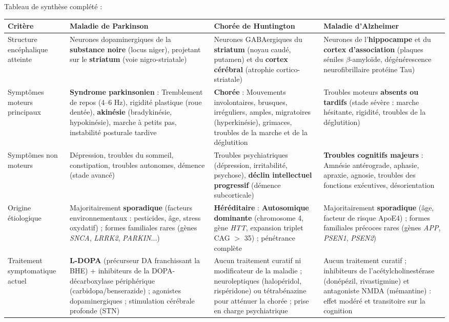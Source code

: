 \documentclass[11pt]{article}
\begin{document}
\begin{corrige}
Tableau de synthèse complété :
\begin{center}
\begin{tabularx}{\linewidth}{|l|X|X|X|}
\hline
\rowcolor{popblueL} Critère & \textbf{Maladie de Parkinson} & \textbf{Chorée de Huntington} & \textbf{Maladie d'Alzheimer} \\
\hline
Structure encéphalique atteinte & Neurones dopaminergiques de la \textbf{substance noire} (locus niger), projetant sur le \textbf{striatum} (voie nigro-striatale) & Neurones GABAergiques du \textbf{striatum} (noyau caudé, putamen) et du \textbf{cortex cérébral} (atrophie cortico-striatale) & Neurones de l'\textbf{hippocampe} et du \textbf{cortex d'association} (plaques séniles $\beta$-amyloïde, dégénérescence neurofibrillaire protéine Tau) \\
\hline
Symptômes moteurs principaux & \textbf{Syndrome parkinsonien} : Tremblement de repos (4--6 Hz), rigidité plastique (roue dentée), \textbf{akinésie} (bradykinésie, hypokinésie), marche à petits pas, instabilité posturale tardive & \textbf{Chorée} : Mouvements involontaires, brusques, irréguliers, amples, migratoires (hyperkinésie), grimaces, troubles de la marche et de la déglutition & Troubles moteurs \textbf{absents ou tardifs} (stade sévère : marche hésitante, rigidité, troubles de la déglutition) \\
\hline
Symptômes non moteurs & Dépression, troubles du sommeil, constipation, troubles autonomes, démence (stade avancé) & Troubles psychiatriques (dépression, irritabilité, psychose), \textbf{déclin intellectuel progressif} (démence subcorticale) & \textbf{Troubles cognitifs majeurs} : Amnésie antérograde, aphasie, apraxie, agnosie, troubles des fonctions exécutives, désorientation \\
\hline
Origine étiologique & Majoritairement \textbf{sporadique} (facteurs environnementaux : pesticides, âge, stress oxydatif) ; formes familiales rares (gènes \emph{SNCA}, \emph{LRRK2}, \emph{PARKIN}...) & \textbf{Héréditaire} : \textbf{Autosomique dominante} (chromosome 4, gène \emph{HTT}, expansion triplet CAG $>$ 35) ; pénétrance complète & Majoritairement \textbf{sporadique} (âge, facteur de risque ApoE4) ; formes familiales précoces rares (gènes \emph{APP}, \emph{PSEN1}, \emph{PSEN2}) \\
\hline
Traitement symptomatique actuel & \textbf{L-DOPA} (précurseur DA franchissant la BHE) + inhibiteurs de la DOPA-décarboxylase périphérique (carbidopa/benserazide) ; agonistes dopaminergiques ; stimulation cérébrale profonde (STN) & Aucun traitement curatif ni modificateur de la maladie ; neuroleptiques (halopéridol, rispéridone) ou tétrabénazine pour atténuer la chorée ; prise en charge psychiatrique & Aucun traitement curatif ; inhibiteurs de l'acétylcholinestérase (donépézil, rivastigmine) et antagoniste NMDA (mémantine) : effet modéré et transitoire sur la cognition \\

\end{tabularx}
\end{center}
\end{corrige}
\end{document}
